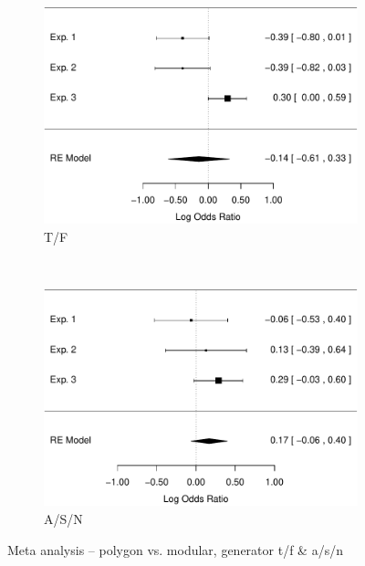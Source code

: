 \documentclass[man,10pt]{apa6}
\begin{document}
\begin{figure}
\centering
\begin{subfigure}[c]{0.4\textwidth}
\centering
\includegraphics[width=\textwidth]{figures/meta/question_typegenerator_TF_n_conditionpolygon.pdf}
\caption{T/F}
\end{subfigure}
~
\begin{subfigure}[c]{0.4\textwidth}
\centering
\includegraphics[width=\textwidth]{figures/meta/question_typegenerator_ASN_n_conditionpolygon.pdf}
\caption{A/S/N}
\end{subfigure}
\caption{Meta analysis -- polygon vs. modular, generator t/f \& a/s/n}
\label{meta_genTF_p}
\end{figure}\noindent 
\end{document}
